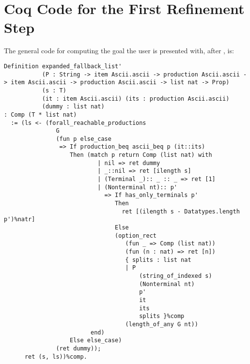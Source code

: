    \section{Coq Code for the First Refinement Step} \label{sec:expanded-fallback-list}
       The general code for computing the goal the user is presented with, after , is:
\begin{verbatim}
Definition expanded_fallback_list'
           (P : String -> item Ascii.ascii -> production Ascii.ascii -> item Ascii.ascii -> production Ascii.ascii -> list nat -> Prop)
           (s : T)
           (it : item Ascii.ascii) (its : production Ascii.ascii)
           (dummy : list nat)
: Comp (T * list nat)
  := (ls <- (forall_reachable_productions
               G
               (fun p else_case
                => If production_beq ascii_beq p (it::its)
                   Then (match p return Comp (list nat) with
                           | nil => ret dummy
                           | _::nil => ret [ilength s]
                           | (Terminal _):: _ :: _ => ret [1]
                           | (Nonterminal nt):: p'
                             => If has_only_terminals p'
                                Then
                                  ret [(ilength s - Datatypes.length p')%natr]
                                Else
                                (option_rect
                                   (fun _ => Comp (list nat))
                                   (fun (n : nat) => ret [n])
                                   { splits : list nat
                                   | P
                                       (string_of_indexed s)
                                       (Nonterminal nt)
                                       p'
                                       it
                                       its
                                       splits }%comp
                                   (length_of_any G nt))
                         end)
                   Else else_case)
               (ret dummy));
      ret (s, ls))%comp.
\end{verbatim}
